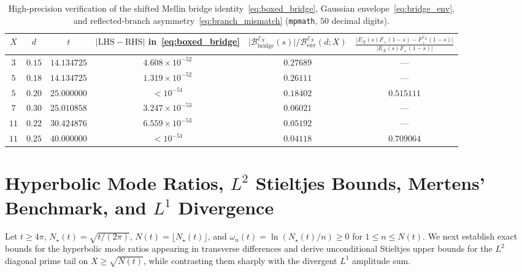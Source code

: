 \documentclass[11pt,reqno]{amsart}
\theoremstyle{plain}
\theoremstyle{definition}
\theoremstyle{remark}
\numberwithin{equation}{section}
\begin{document}
\begin{table}[htbp]
\centering
\caption{High-precision verification of the shifted Mellin bridge identity~\eqref{eq:boxed_bridge}, Gaussian envelope~\eqref{eq:bridge_env}, and reflected-branch asymmetry~\eqref{eq:branch_mismatch} (\texttt{mpmath}, $50$ decimal digits).}\label{tab:bridge_verification}
\small
\begin{tabular}{@{}cccccc@{}}
\toprule
$X$ & $d$ & $t$ & $\lvert\mathrm{LHS} - \mathrm{RHS}\rvert$ in~\eqref{eq:boxed_bridge} & $\lvert\mathcal{B}_{\mathrm{bridge}}^{\mathcal{E}_X}(s)\rvert / \mathcal{B}_{\mathrm{env}}^{\mathcal{E}_X}(d;X)$ & $\frac{\lvert E_X(s)F_+(1-s) - F_+^{\mathcal{E}_X}(1-s)\rvert}{\lvert E_X(s)F_+(1-s)\rvert}$ \\
\midrule
$3$  & $0.15$ & $14.134725$ & $4.608 \times 10^{-52}$ & $0.27689$ & --- \\
$5$  & $0.18$ & $14.134725$ & $1.319 \times 10^{-52}$ & $0.26111$ & --- \\
$5$  & $0.20$ & $25.000000$ & $< 10^{-51}$            & $0.18402$ & $0.515111$ \\
$7$  & $0.30$ & $25.010858$ & $3.247 \times 10^{-53}$ & $0.06021$ & --- \\
$11$ & $0.22$ & $30.424876$ & $6.559 \times 10^{-53}$ & $0.05192$ & --- \\
$11$ & $0.25$ & $40.000000$ & $< 10^{-51}$            & $0.04118$ & $0.709064$ \\
\bottomrule
\end{tabular}
\end{table}

\section{Hyperbolic Mode Ratios, $L^2$ Stieltjes Bounds, Mertens' Benchmark, and $L^1$ Divergence}\label{sec:stieltjes}

Let $t \ge 4\pi$, $N_\star(t) = \sqrt{t/(2\pi)}$, $N(t) = \lfloor N_\star(t)\rfloor$, and $\omega_n(t) = \ln(N_\star(t)/n) \ge 0$ for $1 \le n \le N(t)$. We next establish exact bounds for the hyperbolic mode ratios appearing in transverse differences and derive unconditional Stieltjes upper bounds for the $L^2$ diagonal prime tail on $X \ge \sqrt{N(t)}$, while contrasting them sharply with the divergent $L^1$ amplitude sum.
\end{document}
